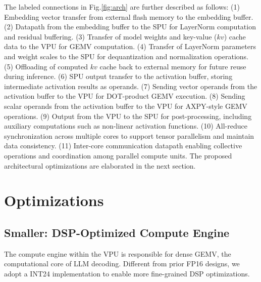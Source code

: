 \documentclass[conference]{IEEEtran}
\begin{document}
The labeled connections in Fig.\ref{fig:arch} are further described as follows:
(1) Embedding vector transfer from external flash memory to the embedding buffer.
(2) Datapath from the embedding buffer to the SPU for LayerNorm computation and residual buffering.
(3) Transfer of model weights and key-value ($kv$) cache data to the VPU for GEMV computation.
(4) Transfer of LayerNorm parameters and weight scales to the SPU for dequantization and normalization operations.
(5) Offloading of computed $kv$ cache back to external memory for future reuse during inference.
(6) SPU output transfer to the activation buffer, storing intermediate activation results as operands.
(7) Sending vector operands from the activation buffer to the VPU for DOT-product GEMV execution.
(8) Sending scalar operands from the activation buffer to the VPU for AXPY-style GEMV operations.
(9) Output from the VPU to the SPU for post-processing, including auxiliary computations such as non-linear activation functions.
(10) All-reduce synchronization across multiple cores to support tensor parallelism and maintain data consistency.
(11) Inter-core communication datapath enabling collective operations and coordination among parallel compute units.
The proposed architectural optimizations are elaborated in the next section.


\section{Optimizations}

\subsection{Smaller: DSP-Optimized Compute Engine}

The compute engine within the VPU is responsible for dense GEMV, the computational core of LLM decoding.
Different from prior FP16 designs\cite{li2025pushing}, we adopt a INT24 implementation to enable more fine-grained DSP optimizations\cite{li2023firefly}.
\end{document}

